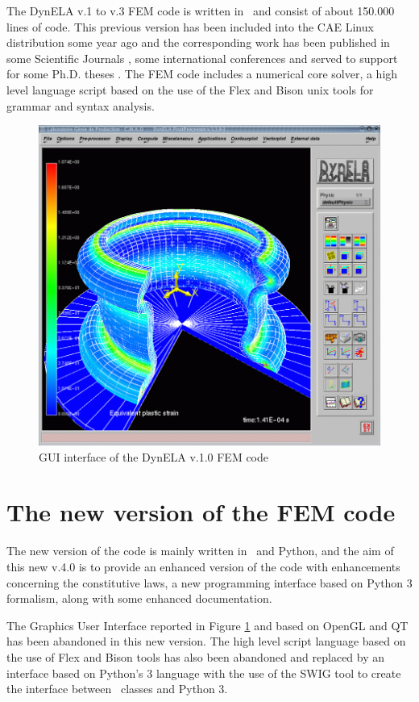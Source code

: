 The DynELA v.1 to v.3 FEM code is written in \Cpp~and consist of about 150.000 lines of code. This previous version has been included into the CAE Linux distribution some year ago and the corresponding work has been published in some Scientific Journals \cite{
pantale_object-oriented_2002,
pantale_development_2004,
pantale_parallelization_2005,
menanteau_methodology_2006,
nistor_numerical_2007,
nistor_numerical_2008,
pantale_rp_2020}
, some international conferences \cite{
menanteau_coupled_2005,
nistor_modeling_2005,
pantale_strategies_2005,
pantale_developpement_2004,
pantale_developpement_1999,
pantale_development_2002}
 and served to support for some Ph.D. theses \cite{
menanteau_developpement_2004,
nistor_identification_2005}
. The FEM code includes a numerical core solver, a high level language script based on the use of the Flex and Bison unix tools for grammar and syntax analysis.

\begin{figure}[h]
\begin{centering}
\includegraphics[width=0.5\columnwidth]{Figures/DynELA-v.1.1}
\par\end{centering}
\caption{GUI interface of the DynELA v.1.0 FEM code\label{fig:History!DynELAv1}}
\end{figure}

\section{The new version of the FEM code}
The new version of the code is mainly written in \Cpp~and Python, and the aim of this new v.4.0 is to provide an enhanced version of the code with enhancements concerning the constitutive laws, a new programming interface based on Python 3 formalism, along with some enhanced documentation.

The Graphics User Interface reported in Figure \ref{fig:History!DynELAv1} and based on OpenGL and QT has been abandoned in this new version. The high level script language based on the use of Flex and Bison tools has also been abandoned and replaced by an interface based on Python's 3 language with the use of the SWIG tool to create the interface between \Cpp~classes and Python 3.